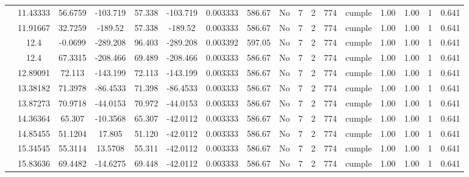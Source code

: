 \begin{table}[H]
{\begin{tabular}{|c|c|c|c|c|c|c|c|c|c|c|c|c|c|c|c|c|}
\cline{2-17}        & 11.43333 & 56.6759 & -103.719 & 57.338 & -103.719 & 0.003333 & 586.67 & No  & 7   & 2   & 774 & \cellcolor[rgb]{ .776,  .937,  .808}cumple & 1.00 & 1.00 & 1   & 0.641 \bigstrut\\
\cline{2-17}        & 11.91667 & 32.7259 & -189.52 & 57.338 & -189.52 & 0.003333 & 586.67 & No  & 7   & 2   & 774 & \cellcolor[rgb]{ .776,  .937,  .808}cumple & 1.00 & 1.00 & 1   & 0.641 \bigstrut\\
\cline{2-17}        & \cellcolor[rgb]{ .851,  .882,  .949}12.4 & -0.0699 & -289.208 & 96.403 & -289.208 & 0.003392 & 597.05 & No  & 7   & 2   & 774 & \cellcolor[rgb]{ .776,  .937,  .808}cumple & 1.00 & 1.00 & 1   & 0.641 \bigstrut\\
\cline{2-17}        & \cellcolor[rgb]{ .851,  .882,  .949}12.4 & 67.3315 & -208.466 & 69.489 & -208.466 & 0.003333 & 586.67 & No  & 7   & 2   & 774 & \cellcolor[rgb]{ .776,  .937,  .808}cumple & 1.00 & 1.00 & 1   & 0.641 \bigstrut\\
\cline{2-17}        & 12.89091 & 72.113 & -143.199 & 72.113 & -143.199 & 0.003333 & 586.67 & No  & 7   & 2   & 774 & \cellcolor[rgb]{ .776,  .937,  .808}cumple & 1.00 & 1.00 & 1   & 0.641 \bigstrut\\
\cline{2-17}        & 13.38182 & 71.3978 & -86.4533 & 71.398 & -86.4533 & 0.003333 & 586.67 & No  & 7   & 2   & 774 & \cellcolor[rgb]{ .776,  .937,  .808}cumple & 1.00 & 1.00 & 1   & 0.641 \bigstrut\\
\cline{2-17}        & 13.87273 & 70.9718 & -44.0153 & 70.972 & -44.0153 & 0.003333 & 586.67 & No  & 7   & 2   & 774 & \cellcolor[rgb]{ .776,  .937,  .808}cumple & 1.00 & 1.00 & 1   & 0.641 \bigstrut\\
\cline{2-17}        & 14.36364 & 65.307 & -10.3568 & 65.307 & -42.0112 & 0.003333 & 586.67 & No  & 7   & 2   & 774 & \cellcolor[rgb]{ .776,  .937,  .808}cumple & 1.00 & 1.00 & 1   & 0.641 \bigstrut\\
\cline{2-17}        & 14.85455 & 51.1204 & 17.805 & 51.120 & -42.0112 & 0.003333 & 586.67 & No  & 7   & 2   & 774 & \cellcolor[rgb]{ .776,  .937,  .808}cumple & 1.00 & 1.00 & 1   & 0.641 \bigstrut\\
\cline{2-17}        & 15.34545 & 55.3114 & 13.5708 & 55.311 & -42.0112 & 0.003333 & 586.67 & No  & 7   & 2   & 774 & \cellcolor[rgb]{ .776,  .937,  .808}cumple & 1.00 & 1.00 & 1   & 0.641 \bigstrut\\
\cline{2-17}        & 15.83636 & 69.4482 & -14.6275 & 69.448 & -42.0112 & 0.003333 & 586.67 & No  & 7   & 2   & 774 & \cellcolor[rgb]{ .776,  .937,  .808}cumple & 1.00 & 1.00 & 1   & 0.641 \bigstrut\\

\end{tabular}}
\end{table}
